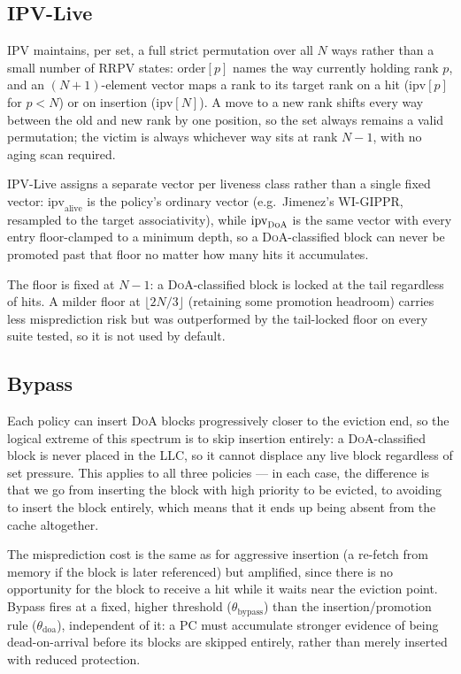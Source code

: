 \documentclass[conference]{IEEEtran}
\newcommand{\ipv}{\textsc{IPV}\xspace}
\newcommand{\doa}{\textsc{DoA}\xspace}
\newcommand{\llc}{\textsc{LLC}\xspace}
\newcommand{\rrpv}{\textsc{RRPV}\xspace}
\begin{document}
\subsection{IPV-Live}

\ipv maintains, per set, a full strict permutation over all $N$ ways rather
than a small number of \rrpv states: $\text{order}[p]$ names the way currently
holding rank $p$, and an $(N{+}1)$-element vector maps a rank to its target
rank on a hit ($\text{ipv}[p]$ for $p<N$) or on insertion ($\text{ipv}[N]$).
A move to a new rank shifts every way between the old and new rank by one
position, so the set always remains a valid permutation; the victim is
always whichever way sits at rank $N{-}1$, with no aging scan required.

\ipv-Live assigns a separate vector per liveness class rather than a single
fixed vector: $\text{ipv}_{\text{alive}}$ is the policy's ordinary vector
(e.g.\ Jimenez's WI-GIPPR, resampled to the target associativity), while
$\text{ipv}_{\doa}$ is the same vector with every entry floor-clamped to a
minimum depth, so a \doa-classified block can never be promoted past that
floor no matter how many hits it accumulates.

The floor is fixed at $N{-}1$: a \doa-classified block is locked at the
tail regardless of hits. A milder floor at $\lfloor 2N/3\rfloor$ (retaining
some promotion headroom) carries less misprediction risk but was
outperformed by the tail-locked floor on every suite tested, so it is not
used by default.



\subsection{Bypass}
\label{sec:bypassstate_policy}

Each policy can insert \doa blocks progressively closer to the eviction end,
so the logical extreme of this spectrum is to skip insertion entirely:
a \doa-classified block is never placed in the \llc, so it cannot displace any
live block regardless of set pressure.
This applies to all three policies --- in each case, the difference is that we
go from inserting the block with high priority to be evicted, to avoiding to
insert the block entirely, which means that it ends up being absent from the cache altogether.

The misprediction cost is the same as for aggressive insertion (a re-fetch from
memory if the block is later referenced) but amplified, since there is no
opportunity for the block to receive a hit while it waits near the eviction
point. Bypass fires at a fixed, higher threshold ($\theta_{\mathrm{bypass}}$)
than the insertion/promotion rule ($\theta_{\mathrm{doa}}$), independent of it:
a \textsc{PC} must accumulate stronger evidence of being dead-on-arrival before
its blocks are skipped entirely, rather than merely inserted with reduced
protection.
\end{document}
